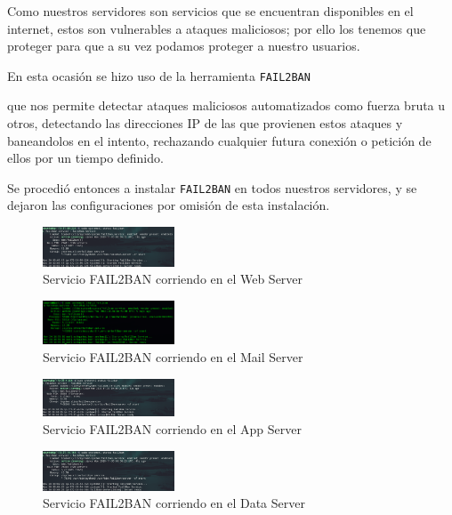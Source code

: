 \documentclass{article}
\newcommand{\ttt}[1]{%
\texttt{#1}%
}
\begin{document}
Como nuestros servidores son servicios que se encuentran
disponibles en el internet, estos son vulnerables a
ataques maliciosos; por ello los tenemos que proteger para
que a su vez podamos proteger a nuestro usuarios.

En esta ocasión se hizo uso de la herramienta \ttt{FAIL2BAN}
que nos permite detectar ataques maliciosos automatizados
como fuerza bruta u otros, detectando las direcciones IP
de las que provienen estos ataques y baneandolos en el
intento, rechazando cualquier futura conexión o petición
de ellos por un tiempo definido.

Se procedió entonces a instalar \ttt{FAIL2BAN} en todos
nuestros servidores, y se dejaron las configuraciones por
omisión de esta instalación.

\begin{figure}[H]
  \centering
  \includegraphics[width=0.35\textwidth]{FAIL2BAN/exhibitB}
  \caption{Servicio FAIL2BAN corriendo en el Web Server}
\end{figure}

\begin{figure}[H]
  \centering
  \includegraphics[width=0.35\textwidth]{FAIL2BAN/exhibitD}
  \caption{Servicio FAIL2BAN corriendo en el Mail Server}
\end{figure}

\begin{figure}[H]
  \centering
  \includegraphics[width=0.35\textwidth]{FAIL2BAN/exhibitA}
  \caption{Servicio FAIL2BAN corriendo en el App Server}
\end{figure}

\begin{figure}[H]
  \centering
  \includegraphics[width=0.35\textwidth]{FAIL2BAN/exhibitC}
  \caption{Servicio FAIL2BAN corriendo en el Data Server}
\end{figure}
\end{document}
